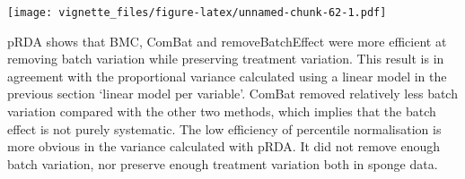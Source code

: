 \documentclass[]{book}
\newenvironment{Shaded}{\begin{snugshade}}{\end{snugshade}}
\newcommand{\KeywordTok}[1]{\textcolor[rgb]{0.13,0.29,0.53}{\textbf{#1}}}
\newcommand{\DataTypeTok}[1]{\textcolor[rgb]{0.13,0.29,0.53}{#1}}
\newcommand{\DecValTok}[1]{\textcolor[rgb]{0.00,0.00,0.81}{#1}}
\newcommand{\FloatTok}[1]{\textcolor[rgb]{0.00,0.00,0.81}{#1}}
\newcommand{\StringTok}[1]{\textcolor[rgb]{0.31,0.60,0.02}{#1}}
\newcommand{\OperatorTok}[1]{\textcolor[rgb]{0.81,0.36,0.00}{\textbf{#1}}}
\newcommand{\NormalTok}[1]{#1}
\begin{document}
\begin{Shaded}
\end{Shaded}

\texttt{[image: vignette\_files/figure-latex/unnamed-chunk-62-1.pdf]}

pRDA shows that BMC, ComBat and removeBatchEffect were more efficient at
removing batch variation while preserving treatment variation. This
result is in agreement with the proportional variance calculated using a
linear model in the previous section `linear model per variable'. ComBat
removed relatively less batch variation compared with the other two
methods, which implies that the batch effect is not purely systematic.
The low efficiency of percentile normalisation is more obvious in the
variance calculated with pRDA. It did not remove enough batch variation,
nor preserve enough treatment variation both in sponge data.
\end{document}
